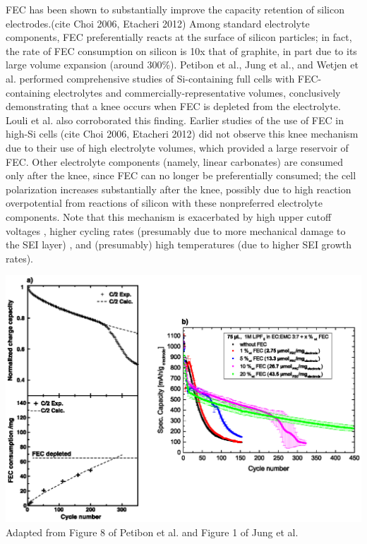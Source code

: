 \documentclass{article}
\begin{document}
FEC has been shown to substantially improve the capacity retention of silicon electrodes.(cite Choi 2006, Etacheri 2012)
Among standard electrolyte components, FEC preferentially reacts at the surface of silicon particles; in fact, the rate of FEC consumption on silicon is 10x that of graphite, in part due to its large volume expansion (around 300\%).\cite{wetjen_differentiating_2017}
Petibon et al.\cite{petibon_studies_2016},
Jung et al.\cite{jung_consumption_2016},
and Wetjen et al.\cite{wetjen_differentiating_2017}
performed comprehensive studies of Si-containing full cells with FEC-containing electrolytes and commercially-representative volumes,
conclusively demonstrating that a knee occurs when FEC is depleted from the electrolyte.
Louli et al.\cite{louli_operando_2019} also corroborated this finding.
Earlier studies of the use of FEC in high-Si cells (cite Choi 2006, Etacheri 2012) did not observe this knee mechanism due to their use of high electrolyte volumes, which provided a large reservoir of FEC.
Other electrolyte components (namely, linear carbonates) are consumed only after the knee, since FEC can no longer be preferentially consumed\cite{petibon_studies_2016}; the cell polarization increases substantially after the knee\cite{petibon_studies_2016, jung_consumption_2016, wetjen_differentiating_2017}, possibly due to high reaction overpotential from reactions of silicon with these nonpreferred electrolyte components.
Note that this mechanism is exacerbated by high upper cutoff voltages \cite{petibon_studies_2016}, higher cycling rates (presumably due to more mechanical damage to the SEI layer) \cite{petibon_studies_2016}, and (presumably) high temperatures (due to higher SEI growth rates).

{
\centering
\includegraphics[scale=0.9]{figures/fec_depletion.eps}
}
Adapted from Figure 8 of Petibon et al.\cite{petibon_studies_2016} and Figure 1 of Jung et al.\cite{jung_consumption_2016}
\end{document}

